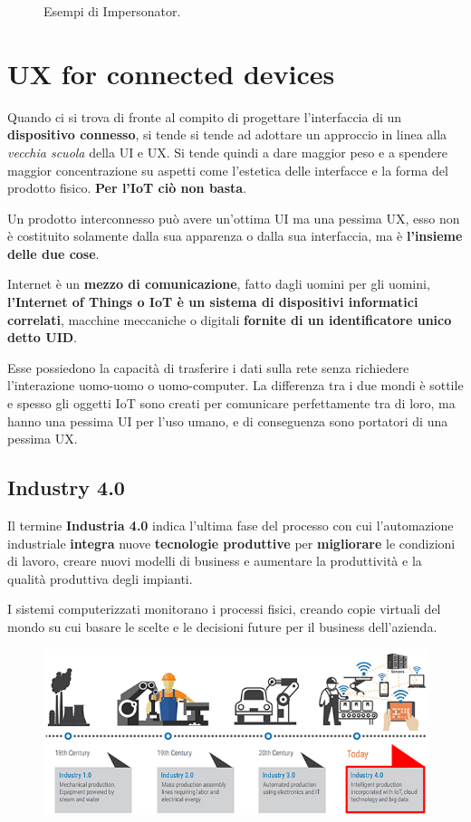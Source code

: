 \documentclass[a4paper,11pt,oneside]{book}
\begin{document}
\begin{figure}[!h]
	\caption{Esempi di Impersonator.}
\end{figure}

\pagebreak

\chapter{UX for connected devices}

Quando ci si trova di fronte al compito di progettare l'interfaccia di un \textbf{dispositivo
	connesso}, si tende si tende ad adottare un approccio in linea alla \textit{vecchia
	scuola} della UI e UX. Si tende quindi a dare maggior peso e a spendere maggior concentrazione su aspetti come l'estetica delle interfacce e la forma del prodotto fisico. \textbf{Per l'IoT ciò non basta}.

Un prodotto interconnesso può avere un'ottima UI ma una pessima UX, esso non è costituito solamente dalla sua apparenza o dalla sua interfaccia, ma è \textbf{l'insieme delle due cose}.

Internet è un \textbf{mezzo di comunicazione}, fatto dagli uomini per gli uomini, \textbf{l'Internet of Things o IoT è un sistema di dispositivi informatici correlati}, macchine meccaniche o digitali \textbf{fornite di un identificatore unico detto UID}.

Esse possiedono la capacità di trasferire i dati sulla rete senza richiedere l'interazione uomo-uomo o uomo-computer.
La differenza tra i due mondi è sottile e spesso gli oggetti IoT sono creati per comunicare perfettamente tra di loro, ma hanno una pessima UI per l'uso umano, e
di conseguenza sono portatori di una pessima UX.

\section{Industry 4.0}

Il termine \textbf{Industria 4.0} indica l'ultima fase del processo con cui l'automazione industriale \textbf{integra} nuove \textbf{tecnologie produttive} per \textbf{migliorare} le condizioni di lavoro, creare nuovi modelli di business e aumentare la produttività e la qualità produttiva degli impianti.

I sistemi computerizzati monitorano i processi fisici, creando copie virtuali del mondo su cui basare le scelte e le decisioni future per il business dell'azienda.

\begin{figure}[!h]
	\centering
	\includegraphics[scale=0.7]{immagini/Industry4.png}
\end{figure}
\end{document}
